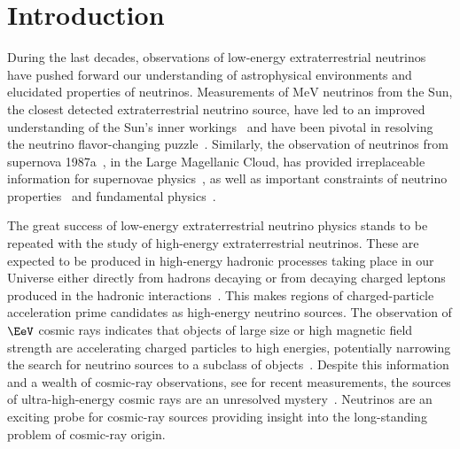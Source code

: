 \chapter{Introduction}

During the last decades, observations of low-energy extraterrestrial neutrinos have pushed forward our understanding of astrophysical environments and elucidated properties of neutrinos.
Measurements of $\si\MeV$ neutrinos from the Sun, the closest detected extraterrestrial neutrino source, have led to an improved understanding of the Sun's inner workings~\cite{Raffelt:1999tx,Bahcall:2004pz} and have been pivotal in resolving the neutrino flavor-changing puzzle~\cite{McDonald:2016ixn}.
Similarly, the observation of neutrinos from supernova 1987a~\cite{Hirata:1987hu,Bratton:1988ww}, in the Large Magellanic Cloud, has provided irreplaceable information for supernovae physics~\cite{Bethe:1990mw}, as well as important constraints of neutrino properties~\cite{Arnett:1987iz,Goldman:1987fg,Manohar:1987ec,Lattimer:1988mf} and fundamental physics~\cite{Raffelt:1987yt,Turner:1987by}.

The great success of low-energy extraterrestrial neutrino physics stands to be repeated with the study of high-energy extraterrestrial neutrinos.
These are expected to be produced in high-energy hadronic processes taking place in our Universe either directly from hadrons decaying or from decaying charged leptons produced in the hadronic interactions~\cite{Gaisser:1994yf}.
This makes regions of charged-particle acceleration prime candidates as high-energy neutrino sources.
The observation of $\si\EeV$ cosmic rays indicates that objects of large size or high magnetic field strength are accelerating charged particles to high energies, potentially narrowing the search for neutrino sources to a subclass of objects~\cite{gaisser1990cosmic,LetessierSelvon:2011dy}.
Despite this information and a wealth of cosmic-ray observations, see  for recent measurements, the sources of ultra-high-energy cosmic rays are an unresolved mystery~\cite{Kotera:2011cp}.
Neutrinos are an exciting probe for cosmic-ray sources providing insight into the long-standing problem of cosmic-ray origin.


